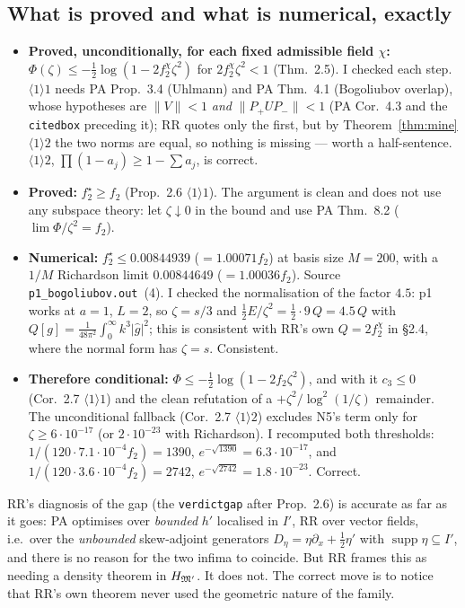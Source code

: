 \documentclass[11pt]{article}
\newcommand{\Pp}{P_+}\newcommand{\Pm}{P_-}\newcommand{\Om}{\Omega}\newcommand{\one}{\mathbf 1}
\newcommand{\norm}[1]{\lVert#1\rVert}\newcommand{\abs}[1]{\lvert#1\rvert}
\begin{document}
\subsection{What is proved and what is numerical, exactly}

\begin{itemize}\itemsep1pt
\item \textbf{Proved, unconditionally, for each fixed admissible field $\chi$:}
 $\Phi(\zeta)\le-\frac12\log(1-2f_2^\chi\zeta^2)$ for $2f_2^\chi\zeta^2<1$
 (Thm.~2.5).  I checked each step.  $\langle1\rangle1$ needs PA Prop.~3.4 (Uhlmann) and PA Thm.~4.1
 (Bogoliubov overlap), whose hypotheses are $\norm V<1$ \emph{and} $\norm{\Pp U\Pm}<1$
 (PA Cor.~4.3 and the \texttt{citedbox} preceding it); RR quotes only the first, but by
 Theorem~\ref{thm:mine} $\langle1\rangle2$ the two norms are equal, so nothing is missing --- worth a
 half-sentence.  $\langle1\rangle2$, $\prod(1-a_j)\ge1-\sum a_j$, is correct.
\item \textbf{Proved:} $f_2^\star\ge f_2$ (Prop.~2.6 $\langle1\rangle1$).  The argument is clean and
 does not use any subspace theory: let $\zeta\downarrow0$ in the bound and use PA Thm.~8.2
 ($\lim\Phi/\zeta^2=f_2$).
\item \textbf{Numerical:} $f_2^\star\le0.00844939$ ($=1.00071f_2$) at basis size $M=200$, with a
 $1/M$ Richardson limit $0.00844649$ ($=1.00036f_2$).  Source \texttt{p1\_bogoliubov.out}~(4).  I
 checked the normalisation of the factor $4.5$: p1 works at $a=1$, $L=2$, so $\zeta=s/3$ and
 $\frac12E/\zeta^2=\frac12\cdot9\,Q=4.5\,Q$ with $Q[g]=\frac1{48\pi^2}\int_0^\infty k^3\abs{\hat
 g}^2$; this is consistent with RR's own $Q=2f_2^\chi$ in \S2.4, where the normal form has
 $\zeta=s$.  Consistent.
\item \textbf{Therefore conditional:} $\Phi\le-\frac12\log(1-2f_2\zeta^2)$, and with it $c_3\le0$
 (Cor.~2.7 $\langle1\rangle1$) and the clean refutation of a $+\zeta^2/\log^2(1/\zeta)$ remainder.
 The unconditional fallback (Cor.~2.7 $\langle1\rangle2$) excludes N5's term only for
 $\zeta\ge6\cdot10^{-17}$ (or $2\cdot10^{-23}$ with Richardson).  I recomputed both thresholds:
 $1/(120\cdot7.1\cdot10^{-4}f_2)=1390$, $e^{-\sqrt{1390}}=6.3\cdot10^{-17}$, and
 $1/(120\cdot3.6\cdot10^{-4}f_2)=2742$, $e^{-\sqrt{2742}}=1.8\cdot10^{-23}$.  Correct.
\end{itemize}

RR's diagnosis of the gap (the \texttt{verdictgap} after Prop.~2.6) is accurate as far as it goes:
PA optimises over \emph{bounded} $h'$ localised in $I'$, RR over vector fields, i.e.\ over the
\emph{unbounded} skew-adjoint generators $D_\eta=\eta\partial_x+\frac12\eta'$ with
$\operatorname{supp}\eta\subseteq I'$, and there is no reason for the two infima to coincide.  But
RR frames this as needing a density theorem in $H_{\mathfrak M'}$.  It does not.  The correct move is to
notice that RR's own theorem never used the geometric nature of the family.
\end{document}
